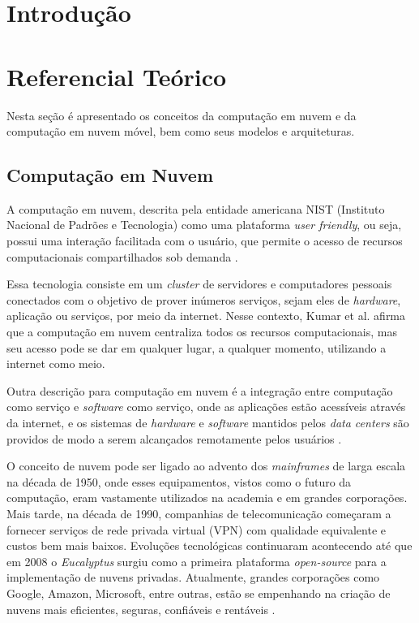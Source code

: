 \documentclass[12pt]{article}
\begin{document}
\section{Introdução}

\lipsum[1]

\section{Referencial Teórico}

Nesta seção é apresentado os conceitos da computação em nuvem e da computação em nuvem
móvel, bem como seus modelos e arquiteturas.

\subsection{Computação em Nuvem}

A computação em nuvem, descrita pela entidade americana NIST (Instituto Nacional de Padrões e Tecnologia)
como uma plataforma \textit{user friendly}, ou seja, possui uma interação facilitada com o usuário, que permite o
acesso de recursos computacionais compartilhados sob demanda \cite{alizadeh2013}.

Essa tecnologia consiste em um \textit{cluster} de servidores e computadores pessoais conectados com o objetivo de
prover inúmeros serviços, sejam eles de \textit{hardware}, aplicação ou serviços, por meio da internet. Nesse contexto,
Kumar et al. \cite{kumar2014} afirma que a computação em nuvem centraliza todos os recursos computacionais, mas seu
acesso pode se dar em qualquer lugar, a qualquer momento, utilizando a internet como meio.

Outra descrição para computação em nuvem é a integração entre computação como serviço e \textit{software} como serviço,
onde as aplicações estão acessíveis através da internet, e os sistemas de \textit{hardware} e \textit{software} mantidos
pelos \textit{data centers} são providos de modo a serem alcançados remotamente pelos usuários \cite{alizadeh2013}.

O conceito de nuvem pode ser ligado ao advento dos \textit{mainframes} de larga escala na década de 1950,
onde esses equipamentos, vistos como o futuro da computação, eram vastamente utilizados na academia e em
grandes corporações. Mais tarde, na década de 1990, companhias de telecomunicação começaram a fornecer
serviços de rede privada virtual (VPN) com qualidade equivalente e custos bem mais baixos.
Evoluções tecnológicas continuaram acontecendo até que em 2008 o \textit{Eucalyptus} surgiu como
a primeira plataforma \textit{open-source} para a implementação de nuvens privadas. Atualmente,
grandes corporações como Google, Amazon, Microsoft, entre outras, estão se empenhando na criação de nuvens mais
eficientes, seguras, confiáveis e rentáveis \cite{kumar2014}.
\end{document}
